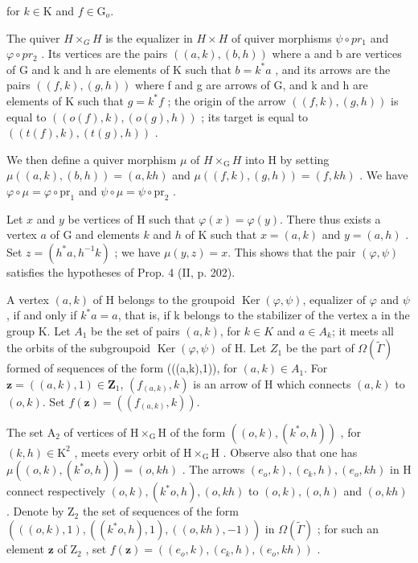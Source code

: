 for \(k\in \mathrm{K}\) and \(f\in \mathrm{G}_o\).

The quiver \(H \times_{G} H\) is the equalizer in \(H \times H\) of quiver morphisms \(\psi \circ pr_{1}\) and \(\varphi \circ pr_{2}\) . Its vertices are the pairs \(((a, k), (b, h))\) where a and b are vertices of G and k and h are elements of K such that \(b = k^{*}a\) , and its arrows are the pairs \(((f, k), (g, h))\) where f and g are arrows of G, and k and h are elements of K such that \(g = k^{*}f\) ; the origin of the arrow \(((f,k),(g,h))\) is equal to \(((o(f),k),(o(g),h))\) ; its target is equal to \(((t(f),k),(t(g),h))\) .

We then define a quiver morphism \(\mu\) of \(H \times_{\mathrm{G}} H\) into H by setting \(\mu((a,k),(b,h)) = (a,kh)\) and \(\mu((f,k),(g,h)) = (f,kh)\) . We have \(\varphi \circ \mu = \varphi \circ \mathrm{pr}_1\) and \(\psi \circ \mu = \psi \circ \mathrm{pr}_2\) .

Let \(x\) and \(y\) be vertices of H such that \(\varphi(x) = \varphi(y)\). There thus exists a vertex \(a\) of G and elements \(k\) and \(h\) of K such that \(x = (a, k)\) and \(y = (a, h)\) . Set \(z = (h^* a, h^{-1} k)\) ; we have \(\mu(y, z) = x\). This shows that the pair \((\varphi, \psi)\) satisfies the hypotheses of Prop. 4 (II, p. 202).

A vertex \((a,k)\) of H belongs to the groupoid \(\operatorname{Ker}(\varphi,\psi)\), equalizer of \(\varphi\) and \(\psi\), if and only if \(k^{*}a=a\), that is, if k belongs to the stabilizer of the vertex a in the group K. Let \(A_{1}\) be the set of pairs \((a,k)\), for \(k\in K\) and \(a\in A_{k}\); it meets all the orbits of the subgroupoid \(\operatorname{Ker}(\varphi,\psi)\) of H. Let \(Z_{1}\) be the part of \(\Omega(\widetilde{\Gamma})\) formed of sequences of the form (((a,k),1)), for \((a,k)\in A_{1}\). For \(\mathbf{z}=((a,k),1)\in\mathbf{Z}_{1}\), \((f_{(a,k)},k)\) is an arrow of H which connects \((a,k)\) to \((o,k)\). Set \(f(\mathbf{z})=((f_{(a,k)},k))\).

The set \(\mathrm{A}_2\) of vertices of \(\mathrm{H} \times_{\mathrm{G}} \mathrm{H}\) of the form \(((o,k), (k^*o,h))\) , for \((k,h) \in \mathrm{K}^2\) , meets every orbit of \(\mathrm{H} \times_{\mathrm{G}} \mathrm{H}\) . Observe also that one has \(\mu((o,k), (k^*o,h)) = (o,kh)\) . The arrows \((e_o,k), (c_k,h), (e_o,kh)\) in H connect respectively \((o,k), (k^*o,h), (o,kh)\) to \((o,k), (o,h)\) and \((o,kh)\) . Denote by \(\mathrm{Z}_2\) the set of sequences of the form \((((o,k),1), ((k^*o,h), 1), ((o,kh), -1))\) in \(\Omega(\widetilde{\Gamma})\) ; for such an element \(\mathbf{z}\) of \(\mathrm{Z}_2\) , set \(f(\mathbf{z}) = ((e_o,k), (c_k,h), (e_o,kh))\) .

